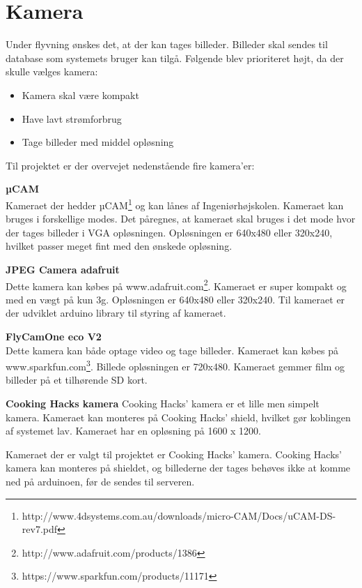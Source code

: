 \section{Kamera}

Under flyvning ønskes det, at der kan tages billeder. Billeder skal sendes til database som systemets bruger kan tilgå. Følgende blev prioriteret højt, da der skulle vælges kamera: 

\begin{itemize}
	\item Kamera skal være kompakt
	\item Have lavt strømforbrug
	\item Tage billeder med middel opløsning
\end{itemize}

Til projektet er der overvejet nedenstående fire kamera'er:

\textbf{µCAM} \\
Kameraet der hedder µCAM\footnote{http://www.4dsystems.com.au/downloads/micro-CAM/Docs/uCAM-DS-rev7.pdf} og kan lånes af Ingeniørhøjskolen. Kameraet kan bruges i forskellige modes. Det påregnes, at kameraet skal bruges i det mode hvor der tages billeder i VGA opløsningen. Opløsningen er 640x480 eller 320x240, hvilket passer meget fint med den ønskede opløsning.

\textbf{JPEG Camera adafruit} \\
Dette kamera kan købes på www.adafruit.com\footnote{http://www.adafruit.com/products/1386}. Kameraet er super kompakt og med en vægt på kun 3g. Opløsningen er  640x480 eller 320x240. Til kameraet er der udviklet arduino library til styring af kameraet.

\textbf{FlyCamOne eco V2} \\
Dette kamera kan både optage video og tage billeder. Kameraet kan købes på www.sparkfun.com\footnote{https://www.sparkfun.com/products/11171}. Billede opløsningen er 720x480. Kameraet gemmer film og billeder på et tilhørende SD kort. 

\textbf{Cooking Hacks kamera}
Cooking Hacks' kamera er et lille men simpelt kamera. Kameraet kan monteres på Cooking Hacks' shield, hvilket gør koblingen af systemet lav. Kameraet har en opløsning på 1600 x 1200.

Kameraet der er valgt til projektet er Cooking Hacks' kamera. Cooking Hacks' kamera kan monteres på shieldet, og billederne der tages behøves ikke at komme ned på arduinoen, før de sendes til serveren.



